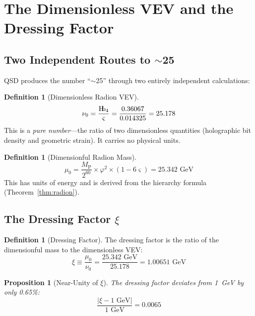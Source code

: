 \documentclass[11pt,a4paper]{article}
\newtheorem{proposition}[theorem]{Proposition}
\theoremstyle{definition}
\newtheorem{definition}[theorem]{Definition}
\theoremstyle{remark}
\newcommand{\Hb}{\textnormal{H\kern-0.3em b}}
\newcommand{\Hbfour}{\Hb_4}
\newcommand{\gr}{\varphi}
\newcommand{\gs}{\varsigma}
\newcommand{\murad}{\mu_0}
\newcommand{\nurad}{\nu_0}
\newcommand{\Mpl}{M_{\mathrm{P}}}
\begin{document}
\section{The Dimensionless VEV and the Dressing Factor}
\label{sec:dressing}

\subsection{Two Independent Routes to $\sim$25}

QSD produces the number ``$\sim$25'' through two entirely independent calculations:

\begin{definition}[Dimensionless Radion VEV]
\begin{equation}
\nurad = \frac{\Hbfour}{\gs} = \frac{0.36067}{0.014325} = 25.178
\end{equation}
This is a \emph{pure number}---the ratio of two dimensionless quantities (holographic bit density and geometric strain). It carries no physical units.
\end{definition}

\begin{definition}[Dimensionful Radion Mass]
\begin{equation}
\murad = \frac{\Mpl}{2^{60}} \times \gr^2 \times (1-6\gs) = 25.342 \text{ GeV}
\end{equation}
This has units of energy and is derived from the hierarchy formula (Theorem~\ref{thm:radion}).
\end{definition}

\subsection{The Dressing Factor $\xi$}

\begin{definition}[Dressing Factor]
\label{def:dressing}
The dressing factor is the ratio of the dimensionful mass to the dimensionless VEV:
\begin{equation}
\boxed{\xi \equiv \frac{\murad}{\nurad} = \frac{25.342 \text{ GeV}}{25.178} = 1.00651 \text{ GeV}}
\end{equation}
\end{definition}

\begin{proposition}[Near-Unity of $\xi$]
The dressing factor deviates from 1~GeV by only 0.65\%:
\begin{equation}
\frac{|\xi - 1\text{ GeV}|}{1\text{ GeV}} = 0.0065
\end{equation}
\end{proposition}
\end{document}
